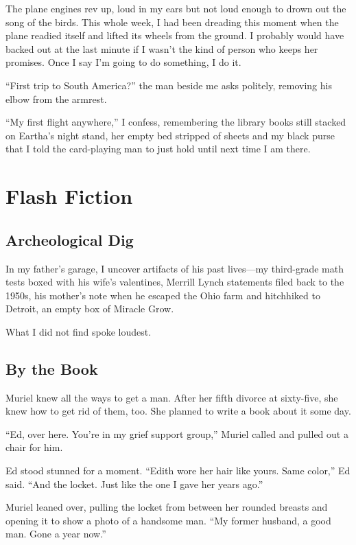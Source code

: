 \documentclass[twoside,10pt]{book}
\begin{document}
The plane engines rev up, loud in my ears but not loud enough to drown
out the song of the birds. This whole week, I had been dreading this
moment when the plane readied itself and lifted its wheels from the
ground. I probably would have backed out at the last minute if I wasn't
the kind of person who keeps her promises. Once I say I'm going to do
something, I do it.

``First trip to South America?'' the man beside me asks politely,
removing his elbow from the armrest.

``My first flight anywhere,'' I confess, remembering the library books
still stacked on Eartha's night stand, her empty bed stripped of sheets
and my black purse that I told the card-playing man to just hold until
next time I am there.

\cleardoublepage
\thispagestyle{empty}
\part{Flash Fiction}



\cleardoublepage
\chapter{Archeological Dig}

In my father's garage, I uncover artifacts of his past lives---my
third-grade math tests boxed with his wife's valentines, Merrill Lynch
statements filed back to the 1950s, his mother's note when he escaped
the Ohio farm and hitchhiked to Detroit, an empty box of Miracle Grow.

What I did not find spoke loudest.



\cleardoublepage
\chapter{By the Book}

Muriel knew all the ways to get a man. After her fifth divorce at
sixty-five, she knew how to get rid of them, too. She planned to write a
book about it some day.

``Ed, over here. You're in my grief support group,'' Muriel called and
pulled out a chair for him.

Ed stood stunned for a moment. ``Edith wore her hair like yours. Same
color,'' Ed said. ``And the locket. Just like the one I gave her years
ago.''

Muriel leaned over, pulling the locket from between her rounded breasts
and opening it to show a photo of a handsome man. ``My former husband, a
good man. Gone a year now.''
\end{document}
